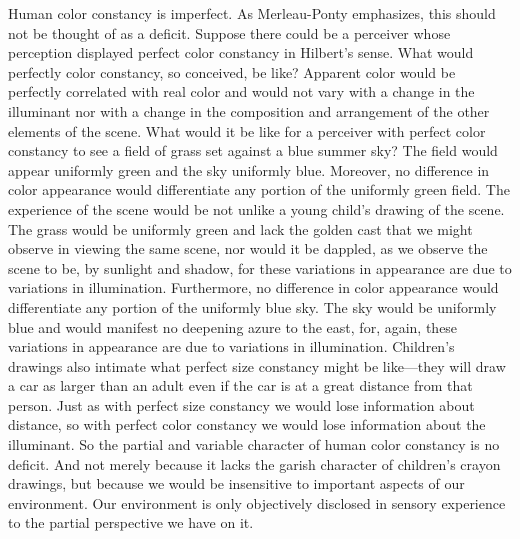 Human color constancy is imperfect. As Merleau-Ponty emphasizes, this should not be thought of as a deficit. Suppose there could be a perceiver whose perception displayed perfect color constancy in Hilbert's sense. What would perfectly color constancy, so conceived, be like? Apparent color would be perfectly correlated with real color and would not vary with a change in the illuminant nor with a change in the composition and arrangement of the other elements of the scene. What would it be like for a perceiver with perfect color constancy to see a field of grass set against a blue summer sky? The field would appear uniformly green and the sky uniformly blue. Moreover, no difference in color appearance would differentiate any portion of the uniformly green field. The experience of the scene would be not unlike a young child's drawing of the scene. The grass would be uniformly green and lack the golden cast that we might observe in viewing the same scene, nor would it be dappled, as we observe the scene to be, by sunlight and shadow, for these variations in appearance are due to variations in illumination. Furthermore, no difference in color appearance would differentiate any portion of the uniformly blue sky. The sky would be uniformly blue and would manifest no deepening azure to the east, for, again, these variations in appearance are due to variations in illumination. Children's drawings also intimate what perfect size constancy might be like---they will draw a car as larger than an adult even if the car is at a great distance from that person. Just as with perfect size constancy we would lose information about distance, so with perfect color constancy we would lose information about the illuminant. So the partial and variable character of human color constancy is no deficit. And not merely because it lacks the garish character of children's crayon drawings, but because we would be insensitive to important aspects of our environment. Our environment is only objectively disclosed in sensory experience to the partial perspective we have on it.

